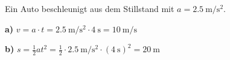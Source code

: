\begin{questions}

  \question Ein Auto beschleunigt aus dem Stillstand mit
  $a = \SI{2.5}{\meter\per\second\squared}$.


  \begin{solution}
    \textbf{a)} $v = a \cdot t = \SI{2.5}{\meter\per\second\squared} \cdot \SI{4}{\second} = \SI{10}{\meter\per\second}$

    \textbf{b)} $s = \frac{1}{2} a t^2 = \frac{1}{2} \cdot \SI{2.5}{\meter\per\second\squared} \cdot (\SI{4}{\second})^2 = \SI{20}{\meter}$
  \end{solution}

\end{questions}


